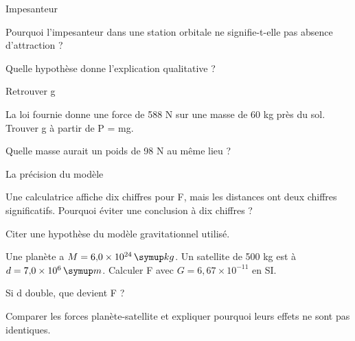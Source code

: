 \par\noindent\begin{minipage}{\linewidth}
\begin{exercice}[3]{Impesanteur}
\begin{questions}
\item Pourquoi l’impesanteur dans une station orbitale ne signifie-t-elle pas absence d’attraction ?
\item Quelle hypothèse donne l’explication qualitative ?
\end{questions}
\end{exercice}
\end{minipage}
\par\noindent\begin{minipage}{\linewidth}
\begin{exercice}[3]{Retrouver g}
\begin{questions}
\item La loi fournie donne une force de 588 N sur une masse de 60 kg près du sol. Trouver g à partir de P = mg.
\item Quelle masse aurait un poids de 98 N au même lieu ?
\end{questions}
\end{exercice}
\end{minipage}
\par\noindent\begin{minipage}{\linewidth}
\begin{exercice}[3]{La précision du modèle}
\begin{questions}
\item Une calculatrice affiche dix chiffres pour F, mais les distances ont deux chiffres significatifs. Pourquoi éviter une conclusion à dix chiffres ?
\item Citer une hypothèse du modèle gravitationnel utilisé.
\end{questions}
\end{exercice}
\end{minipage}
\label{defi-ex-10}
\begin{questions}
\item Une planète a $M=6{,}0\times10^{24}\unite{kg}$. Un satellite de 500 kg est à $d=7{,}0\times10^6\unite m$. Calculer F avec $G=6{,}67\times10^{-11}$ en SI.
\item Si d double, que devient F ?
\item Comparer les forces planète-satellite et expliquer pourquoi leurs effets ne sont pas identiques.
\end{questions}
\pcGrille
